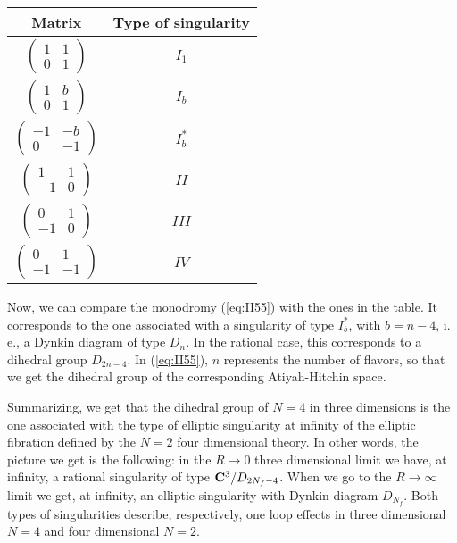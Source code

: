 \begin{center}

\begin{tabular}{|c|c|}     \hline\hline
	 {\bf Matrix}         & {\bf Type of singularity}     \\ \hline
	 $\left( \begin{array}{cc} 1 & 1  \\
			 0 & 1 
	\end{array} \right)$     & $I_1$   \\
	 $\left( \begin{array}{cc} 1 & b  \\
			 0 & 1 
	\end{array} \right)$     & $I_b$   \\
	 $\left( \begin{array}{cc} -1 & -b  \\
			 0 & -1 
	\end{array} \right)$     & $I_b^*$   \\
	 $\left( \begin{array}{cc} 1 & 1  \\
			 -1 & 0 
	\end{array} \right)$     & $II$   \\
	 $\left( \begin{array}{cc} 0 & 1  \\
			 -1 & 0 
	\end{array} \right)$     & $III$   \\
	 $\left( \begin{array}{cc} 0 & 1  \\
			 -1 & -1 
	\end{array} \right)$     & $IV$   \\ \hline\hline
	 
\end{tabular}
\label{tab:4}
\end{center}
  

Now, we can compare the monodromy (\ref{eq:II55}) with the ones
in the table. It corresponds to the one associated with a
singularity of type $I_b^*$, with $b=n-4$, i. e., a Dynkin
diagram of type $D_n$. In the rational case, this corresponds to
a dihedral group $D_{2n-4}$. In (\ref{eq:II55}), $n$ represents
the number of flavors, so that we get the dihedral group of the
corresponding Atiyah-Hitchin space.
  
Summarizing, we get that the dihedral group of $N=4$ in three
dimensions is the one associated with the type of elliptic
singularity at infinity of the elliptic fibration defined by the
$N=2$ four dimensional theory. In other words, the picture we get
is the following: in the $R \rightarrow 0$ three dimensional
limit we have, at infinity, a rational singularity of type ${\bf
C}^3/D_{2N_f-4}$. When we go to the $R \rightarrow \infty$ limit
we get, at infinity, an elliptic singularity with Dynkin diagram
$D_{N_f}$. Both types of singularities describe, respectively,
one loop effects in three dimensional $N=4$ and four dimensional
$N=2$.


